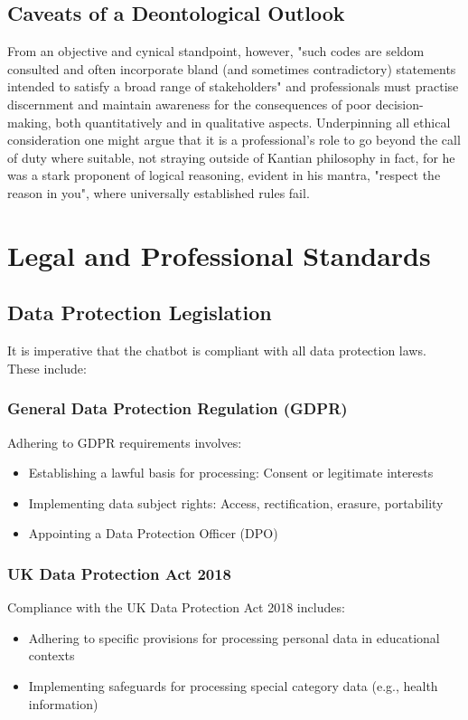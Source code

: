\documentclass[15pt,a4paper]{article}
\begin{document}
\begin{multicols}{2}
\subsection{Caveats of a Deontological Outlook}

From an objective and cynical standpoint, however, "such codes are seldom consulted and often incorporate bland (and sometimes contradictory) statements intended to satisfy a broad range of stakeholders" \textit{\parencite[p. 40]{Blundell2020}} and professionals must practise discernment and maintain awareness for the consequences of poor decision-making, both quantitatively and in qualitative aspects. Underpinning all ethical consideration one might argue that it is a professional's role to go beyond the call of duty where suitable, not straying outside of Kantian philosophy in fact, for he was a stark proponent of logical reasoning, evident in his mantra, "respect the reason in you", where universally established rules fail.
\section{Legal and Professional Standards}
\subsection{Data Protection Legislation}
It is imperative that the chatbot is compliant with all data protection laws. These include:

\subsubsection*{General Data Protection Regulation (GDPR)}
Adhering to GDPR requirements \textit{\parencite{EU2016}} involves:
\begin{itemize}
    \item Establishing a lawful basis for processing: Consent or legitimate interests
    \item Implementing data subject rights: Access, rectification, erasure, portability
    \item Appointing a Data Protection Officer (DPO)
\end{itemize}

\subsubsection*{UK Data Protection Act 2018}
Compliance with the UK Data Protection Act 2018 \textit{\parencite{UKGov2018}} includes:
\begin{itemize}
    \item Adhering to specific provisions for processing personal data in educational contexts
    \item Implementing safeguards for processing special category data (e.g., health information)
\end{itemize}


\end{multicols}
\end{document}
